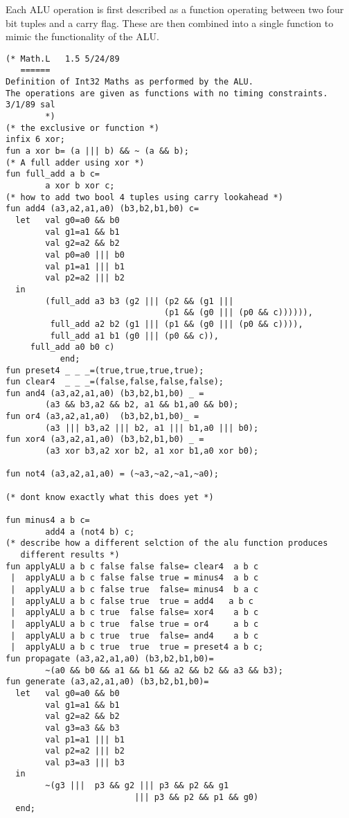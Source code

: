 Each ALU operation is first described as a function operating between
two four bit tuples and a carry flag.
These are then combined into a single function to mimic the functionality of the ALU.
\begin{verbatim}
(* Math.L	1.5	5/24/89
   ======
Definition of Int32 Maths as performed by the ALU.
The operations are given as functions with no timing constraints.
3/1/89 sal
        *)
(* the exclusive or function *)
infix 6 xor;
fun a xor b= (a ||| b) && ~ (a && b);
(* A full adder using xor *)
fun full_add a b c=
        a xor b xor c;
(* how to add two bool 4 tuples using carry lookahead *)
fun add4 (a3,a2,a1,a0) (b3,b2,b1,b0) c=
  let   val g0=a0 && b0 
        val g1=a1 && b1 
        val g2=a2 && b2 
        val p0=a0 ||| b0
        val p1=a1 ||| b1
        val p2=a2 ||| b2
  in
        (full_add a3 b3 (g2 ||| (p2 && (g1 |||
                                (p1 && (g0 ||| (p0 && c)))))),
         full_add a2 b2 (g1 ||| (p1 && (g0 ||| (p0 && c)))),
         full_add a1 b1 (g0 ||| (p0 && c)),
	 full_add a0 b0 c)
           end;
fun preset4 _ _ _=(true,true,true,true);
fun clear4  _ _ _=(false,false,false,false);
fun and4 (a3,a2,a1,a0) (b3,b2,b1,b0) _ =
        (a3 && b3,a2 && b2, a1 && b1,a0 && b0);
fun or4 (a3,a2,a1,a0)  (b3,b2,b1,b0)_ =
        (a3 ||| b3,a2 ||| b2, a1 ||| b1,a0 ||| b0);
fun xor4 (a3,a2,a1,a0) (b3,b2,b1,b0) _ =
        (a3 xor b3,a2 xor b2, a1 xor b1,a0 xor b0);

fun not4 (a3,a2,a1,a0) = (~a3,~a2,~a1,~a0);

(* dont know exactly what this does yet *)

fun minus4 a b c=
        add4 a (not4 b) c;
(* describe how a different selction of the alu function produces
   different results *)
fun applyALU a b c false false false= clear4  a b c
 |  applyALU a b c false false true = minus4  a b c
 |  applyALU a b c false true  false= minus4  b a c
 |  applyALU a b c false true  true = add4   a b c
 |  applyALU a b c true  false false= xor4    a b c
 |  applyALU a b c true  false true = or4     a b c
 |  applyALU a b c true  true  false= and4    a b c
 |  applyALU a b c true  true  true = preset4 a b c;
fun propagate (a3,a2,a1,a0) (b3,b2,b1,b0)=
        ~(a0 && b0 && a1 && b1 && a2 && b2 && a3 && b3);
fun generate (a3,a2,a1,a0) (b3,b2,b1,b0)=
  let   val g0=a0 && b0 
        val g1=a1 && b1 
        val g2=a2 && b2 
        val g3=a3 && b3
        val p1=a1 ||| b1
        val p2=a2 ||| b2
        val p3=a3 ||| b3
  in
        ~(g3 |||  p3 && g2 ||| p3 && p2 && g1 
                          ||| p3 && p2 && p1 && g0)
  end;
\end{verbatim}
